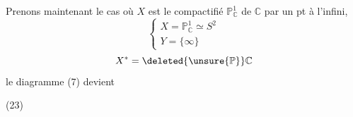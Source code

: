 Prenons maintenant le cas où $X$ est le
compactifié $\mathbb P^1_{\mathbb C}$ de $\mathbb C$ par un pt à l'infini,
\[
\left\{\begin{array}{l}
X=\mathbb P^1_{\mathbb C}\simeq S^2\\
Y=\{\infty\}
\end{array}\right.
\]
\[
X^*=\deleted{\unsure{\mathbb P}}\mathbb C
\]
le diagramme (7) devient

\noindent (23)

